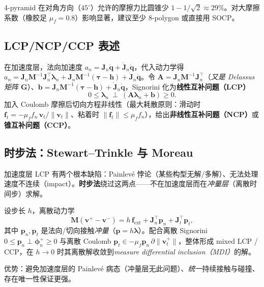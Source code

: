 \begin{pitfall}
4-pyramid 在对角方向（$45^\circ$）允许的摩擦力比圆锥少 $1-1/\sqrt2\approx29\%$。对大摩擦系数（橡胶足 $\mu_f=0.8$）影响显著，建议至少 8-polygon 或直接用 SOCP。
\end{pitfall}

\subsection{LCP/NCP/CCP 表述}
在加速度层，法向加速度 $a_n=\mathbf J_n\ddot{\mathbf q}+\dot{\mathbf J}_n\dot{\mathbf q}$，代入动力学得 $a_n=\mathbf J_n\mathbf M^{-1}\mathbf J_n^\top\boldsymbol\lambda_n+\mathbf J_n\mathbf M^{-1}(\boldsymbol\tau-\mathbf h)+\dot{\mathbf J}_n\dot{\mathbf q}$。令 $\mathbf A=\mathbf J_n\mathbf M^{-1}\mathbf J_n^\top$（\emph{又是 Delassus 矩阵 $\mathbf G$}）、$\mathbf b=\mathbf J_n\mathbf M^{-1}(\boldsymbol\tau-\mathbf h)+\dot{\mathbf J}_n\dot{\mathbf q}$，Signorini 化为\textbf{线性互补问题（LCP）}
\begin{equation}
  0\le\boldsymbol\lambda_n\ \perp\ (\mathbf A\boldsymbol\lambda_n+\mathbf b)\ge0.
  \label{eq:cd-lcp}
\end{equation}
加入 Coulomb 摩擦后切向方程非线性（最大耗散原则：滑动时 $\mathbf f_t=-\mu_f f_n\,\mathbf v_t/\|\mathbf v_t\|$、粘着时 $\|\mathbf f_t\|\le\mu_f f_n$），给出\textbf{非线性互补问题（NCP）}或\textbf{锥互补问题（CCP）}。

\subsection{时步法：Stewart--Trinkle 与 Moreau}
加速度层 LCP 有两个根本缺陷：Painlevé 悖论（某些构型无解/多解）、无法处理速度不连续（impact）。\textbf{时步法}绕过这两点——不在加速度层而在\emph{冲量层}（离散时间步）求解。

\begin{theorem}\label{thm:cd-stewart}
设步长 $h$，离散动力学
\begin{equation}
  \mathbf M(\mathbf v^+-\mathbf v^-)=h\,\mathbf f_{\text{ext}}+\mathbf J_n^\top\mathbf p_n+\mathbf J_t^\top\mathbf p_t,
  \label{eq:cd-stewart}
\end{equation}
其中 $\mathbf p_n,\mathbf p_t$ 是法向/切向接触\emph{冲量}（$\mathbf p=h\boldsymbol\lambda$）。配合离散 Signorini $0\le\mathbf p_n\perp\boldsymbol\phi_n^+\ge0$ 与离散 Coulomb $\mathbf p_t\in-\mu_f\mathbf p_n\,\partial\|\mathbf v_t^+\|$，整体形成 mixed LCP / CCP，在 $h\to0$ 时其离散解收敛到\emph{measure differential inclusion（MDI）}的解。
\end{theorem}
\noindent 优势：避免加速度层的 Painlevé 病态（冲量层无此问题）、\emph{统一}持续接触与碰撞、存在唯一性保证更强。

